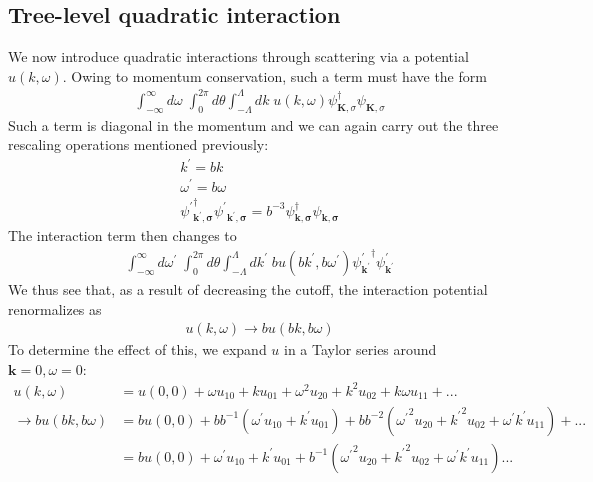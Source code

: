 \documentclass[14pt]{extarticle}
\begin{document}
\subsection{Tree-level quadratic interaction}
We now introduce quadratic interactions through scattering via a potential \(u(k,\omega)\). Owing to momentum conservation, such a term must have the form
\begin{equation}\begin{aligned}
	\int_{-\infty}^\infty d\omega\;\int_0^{2\pi} d\theta \int_{-\Lambda}^{\Lambda}dk \;u({k},\omega)\psi_{\mathbf{K},\sigma}^\dagger\psi_{\mathbf{K},\sigma}
\end{aligned}\end{equation}
Such a term is diagonal in the momentum and we can again carry out the three rescaling operations mentioned previously:
\begin{gather}
k^\prime = b k\\
\omega^\prime = b \omega\\
{\psi^\prime}^\dagger_\mathbf{k^\prime,\sigma}{\psi^\prime}_\mathbf{k^\prime,\sigma} = b^{-3}\psi^\dagger_\mathbf{k,\sigma}\psi_\mathbf{k,\sigma}
\end{gather}
The interaction term then changes to
\begin{equation}\begin{aligned}
\int_{-\infty}^\infty d\omega^\prime\;\int_0^{2\pi} d\theta \int_{-\Lambda}^{\Lambda}dk^\prime \;b u(b{k}^\prime,b\omega^\prime){\psi^\prime_{\mathbf k^\prime}}^\dagger\psi^\prime_{\mathbf k^\prime}
\end{aligned}\end{equation}
We thus see that, as a result of decreasing the cutoff, the interaction potential renormalizes as
\begin{equation}\begin{aligned}
	u({k},\omega) \to b u(b{k},b\omega)
\end{aligned}\end{equation}
To determine the effect of this, we expand \(u\) in a Taylor series around \(\mathbf{k}=0,\omega=0\):
\begin{equation}\begin{aligned}
	u({k},\omega) &= u(0,0) + \omega u_{10} + k u_{01} + \omega^2 u_{20} + k^2 u_{02} + k\omega u_{11} + ...\\
	\to b u(b{k},b\omega) &= bu(0,0) + b b^{-1}\left(\omega^\prime u_{10} + k^\prime u_{01}\right) + b b^{-2} \left({\omega^\prime}^2 u_{20} + {k^\prime}^2 u_{02} + \omega^\prime k^\prime u_{11}\right) + ...\\
			      &= bu(0,0) + \omega^\prime u_{10} + k^\prime u_{01} + b^{-1} \left({\omega^\prime}^2 u_{20} + {k^\prime}^2 u_{02} + \omega^\prime k^\prime u_{11}\right)...
\end{aligned}\end{equation}
\end{document}
